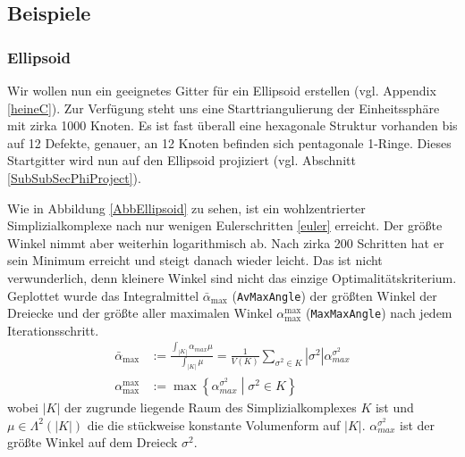   
  \subsection{Beispiele}
    
    \subsubsection{Ellipsoid}
      Wir wollen nun ein geeignetes Gitter für ein Ellipsoid erstellen (vgl. Appendix \ref{heineC}).
      Zur Verfügung steht uns eine Starttriangulierung der Einheitssphäre mit zirka 1000 Knoten.
      Es ist fast überall eine hexagonale Struktur vorhanden bis auf 12 Defekte, genauer, an 12 Knoten
      befinden sich pentagonale 1-Ringe. 
      Dieses Startgitter wird nun auf den Ellipsoid projiziert (vgl. Abschnitt \ref{SubSubSecPhiProject}).
      
      Wie in Abbildung \ref{AbbEllipsoid} zu sehen, ist ein wohlzentrierter Simplizialkomplexe nach nur
      wenigen Eulerschritten \eqref{euler} erreicht. 
      Der größte Winkel nimmt aber weiterhin logarithmisch ab. 
      Nach zirka 200 Schritten hat er sein Minimum erreicht und steigt danach wieder leicht.
      Das ist nicht verwunderlich, denn kleinere Winkel sind nicht das einzige Optimalitätskriterium.
      Geplottet wurde das Integralmittel \( \bar{\alpha}_{\max} \) (\texttt{AvMaxAngle}) der größten Winkel der Dreiecke
      und der größte aller maximalen Winkel \(\alpha_{\max}^{\max} \) (\texttt{MaxMaxAngle}) nach jedem Iterationsschritt.
      \begin{align}
         \bar{\alpha}_{\max} &:= \frac{\int_{|K|}\alpha_{max}\mu}{\int_{|K|}\mu}
                              = \frac{1}{V(K)} \sum_{\sigma^{2}\in K} |\sigma^{2}| \alpha_{max}^{\sigma^{2}} \\
         \alpha_{\max}^{\max} &:= \max\left\{ \alpha_{max}^{\sigma^{2}} \middle| \sigma^{2} \in K \right\}
      \end{align}
      wobei \( |K| \) der zugrunde liegende Raum des Simplizialkomplexes \( K \) ist 
      und \( \mu\in\Lambda^{2}(|K|) \) die die stückweise konstante Volumenform auf \( |K| \).
      \( \alpha_{max}^{\sigma^{2}} \) ist der größte Winkel auf dem Dreieck \( \sigma^{2} \).

